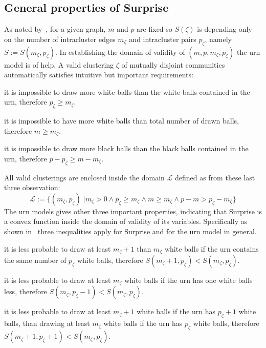 \subsection{General properties of Surprise}
As noted by~\cite{fleck2014}, for a given graph, $m$ and $p$ are fixed so $S(\zeta)$ is depending only on the number of intracluster edges $m_\zeta$ and intracluster pairs $p_\zeta$, namely $S:=S(m_\zeta,p_\zeta)$.
In establishing the domain of validity of $(m,p,m_\zeta,p_\zeta)$ the urn model is of help. A valid clustering $\zeta$ of mutually disjoint communities automatically satisfies intuitive but important requirements:
\begin{obs}
it is impossible to draw more white balls than the white balls contained in the urn, therefore $p_\zeta \geq m_\zeta$.
\end{obs}
\begin{obs}
it is impossible to have more white balls than total number of drawn balls, therefore $m\geq m_\zeta$.
\end{obs}
\begin{obs}
it is impossible to draw more black balls than the black balls contained in the urn, therefore $p-p_\zeta \geq m-m_\zeta$.
\end{obs}
All valid clusterings are enclosed inside the domain $\mathcal{L}$ defined as from these last three observation:
\begin{equation}
\mathcal{L} := \{ ( m_\zeta,p_\zeta) \; | m_\zeta > 0 \land p_\zeta \geq m_\zeta \land m \geq m_\zeta \land p-m > p_\zeta - m_\zeta \}
\end{equation}
The urn models gives other three important properties, indicating that Surprise is a convex function inside the domain of validity of its variables. Specifically as shown in~\cite{fleck2014} three inequalities apply for Surprise and for the urn model in general.
\begin{props}\label{prop:prop1}
\label{list:surprise_properties} it is less probable to draw at least $m_\zeta+1$ than $m_\zeta$ white balls if the urn contains the same number of $p_\zeta$ white balls, therefore $S(m_\zeta+1,p_\zeta) < S(m_\zeta,p_\zeta)$.
\end{props}
\begin{props}\label{prop:prop2}
it is less probable to draw at least $m_\zeta$ white balls if the urn has one white balls less, therefore $S(m_\zeta,p_\zeta-1) < S(m_\zeta,p_\zeta)$.
\end{props}
\begin{props}\label{prop:prop3}
it is less probable to draw at least $m_\zeta+1$ white balls if the urn has $p_\zeta+1$ white balls, than drawing at least $m_\zeta$ white balls if the urn has $p_\zeta$ white balls, therefore $S(m_\zeta+1,p_\zeta+1) < S(m_\zeta,p_\zeta)$.
\end{props}
